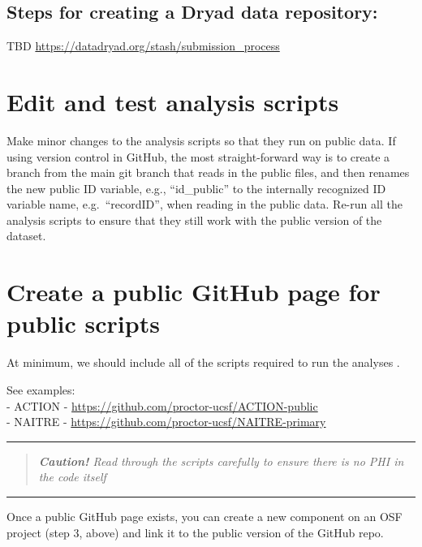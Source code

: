 \documentclass[
]{book}
\begin{document}
\subsection{Steps for creating a Dryad data repository:}\label{steps-for-creating-a-dryad-data-repository}

TBD
\url{https://datadryad.org/stash/submission_process}

\section{Edit and test analysis scripts}\label{edit-and-test-analysis-scripts}

Make minor changes to the analysis scripts so that they run on public data. If using version control in GitHub, the most straight-forward way is to create a branch from the main git branch that reads in the public files, and then renames the new public ID variable, e.g., ``id\_public'' to the internally recognized ID variable name, e.g.~``recordID'', when reading in the public data. Re-run all the analysis scripts to ensure that they still work with the public version of the dataset.

\section{Create a public GitHub page for public scripts}\label{create-a-public-github-page-for-public-scripts}

At minimum, we should include all of the scripts required to run the analyses .

See examples:\\
- ACTION - \url{https://github.com/proctor-ucsf/ACTION-public}\\
- NAITRE - \url{https://github.com/proctor-ucsf/NAITRE-primary}

\begin{center}\rule{0.5\linewidth}{0.5pt}\end{center}

\begin{quote}
\emph{\textbf{Caution!} Read through the scripts carefully to ensure there is no PHI in the code itself }
\end{quote}

\begin{center}\rule{0.5\linewidth}{0.5pt}\end{center}

Once a public GitHub page exists, you can create a new component on an OSF project (step 3, above) and link it to the public version of the GitHub repo.
\end{document}
